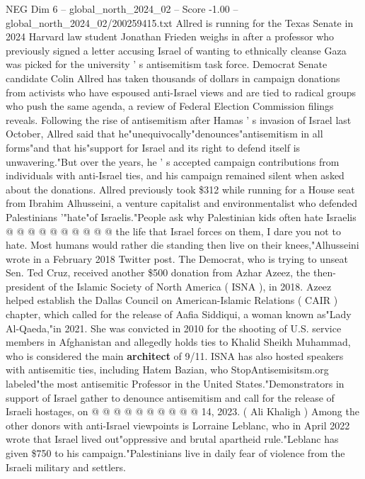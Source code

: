\begin{textsample}{NEG Dim 6 – global\_north\_2024\_02 – Score -1.00 – global\_north\_2024\_02/200259415.txt}  \label{ex:f6_neg_253}
Allred is running for the Texas Senate in 2024 Harvard law student Jonathan Frieden weighs in after a professor who previously signed a letter accusing Israel of wanting to ethnically cleanse Gaza was picked for the university ' s antisemitism task force.
Democrat Senate candidate Colin Allred has taken thousands of dollars in campaign donations from activists who have espoused anti-Israel views and are tied to radical groups who push the same agenda, a review of Federal Election Commission filings reveals.
Following the rise of antisemitism after Hamas ' s invasion of Israel last October, Allred said that he"unequivocally"denounces"antisemitism in all forms"and that his"support for Israel and its right to defend itself is unwavering."But over the years, he ' s accepted campaign contributions from individuals with anti-Israel ties, and his campaign remained silent when asked about the donations.
Allred previously took \$312 while running for a House seat from Ibrahim Alhusseini, a venture capitalist and environmentalist who defended Palestinians '"hate"of Israelis."People ask why Palestinian kids often hate Israelis @ @ @ @ @ @ @ @ @ @ the life that Israel forces on them, I dare you not to hate.
Most humans would rather die standing then live on their knees,"Alhusseini wrote in a February 2018 Twitter post.
The Democrat, who is trying to unseat Sen.
Ted Cruz, received another \$500 donation from Azhar Azeez, the then-president of the Islamic Society of North America ( ISNA ), in 2018.
Azeez helped establish the Dallas Council on American-Islamic Relations ( CAIR ) chapter, which called for the release of Aafia Siddiqui, a woman known as"Lady Al-Qaeda,"in 2021.
She was convicted in 2010 for the shooting of U.S. service members in Afghanistan and allegedly holds ties to Khalid Sheikh Muhammad, who is considered the main \textbf{architect} of 9/11.
ISNA has also hosted speakers with antisemitic ties, including Hatem Bazian, who StopAntisemisitsm.org labeled"the most antisemitic Professor in the United States."Demonstrators in support of Israel gather to denounce antisemitism and call for the release of Israeli hostages, on @ @ @ @ @ @ @ @ @ @ 14, 2023. ( Ali Khaligh ) Among the other donors with anti-Israel viewpoints is Lorraine Leblanc, who in April 2022 wrote that Israel lived out"oppressive and brutal apartheid rule."Leblanc has given \$750 to his campaign."Palestinians live in daily fear of violence from the Israeli military and settlers.

\end{textsample}
